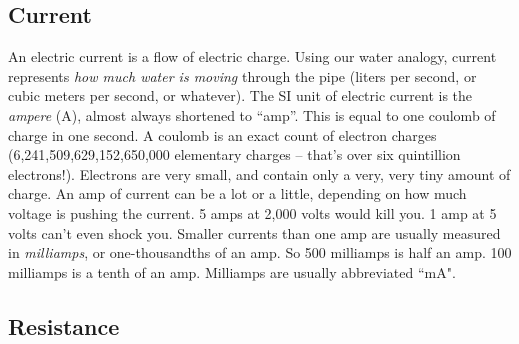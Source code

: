 \bigskip



\subsection*{Current}

An electric current is a flow of electric charge. Using our water analogy, current represents \emph{how much water is moving} through the pipe (liters per second, or cubic meters per second, or whatever).  The SI unit of electric current is the \emph{ampere} (A), almost always shortened to ``amp''. This is equal to one coulomb of charge in one second. A coulomb is an exact count of electron charges (6,241,509,629,152,650,000 elementary charges -- that's over six quintillion electrons!). Electrons are very small, and contain only a very, very tiny amount of charge. An amp of current can be a lot or a little, depending on how much voltage is pushing the current. 5 amps at 2,000 volts would kill you. 1 amp at 5 volts can't even shock you. Smaller currents than one amp are usually measured in \emph{milliamps}, or one-thousandths of an amp. So 500 milliamps is half an amp. 100 milliamps is a tenth of an amp. Milliamps are usually abbreviated ``mA".

\bigskip




\subsection*{Resistance}

